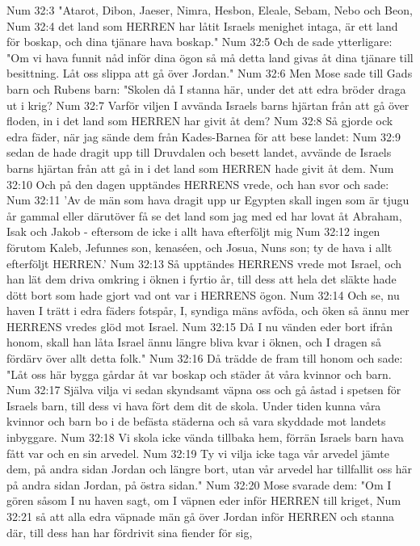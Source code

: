 Num 32:3  "Atarot, Dibon, Jaeser, Nimra, Hesbon, Eleale, Sebam, Nebo och Beon,
Num 32:4  det land som HERREN har låtit Israels menighet intaga, är ett land för boskap, och dina tjänare hava boskap."
Num 32:5  Och de sade ytterligare: "Om vi hava funnit nåd inför dina ögon så må detta land givas åt dina tjänare till besittning. Låt oss slippa att gå över Jordan."
Num 32:6  Men Mose sade till Gads barn och Rubens barn: "Skolen då I stanna här, under det att edra bröder draga ut i krig?
Num 32:7  Varför viljen I avvända Israels barns hjärtan från att gå över floden, in i det land som HERREN har givit åt dem?
Num 32:8  Så gjorde ock edra fäder, när jag sände dem från Kades-Barnea för att bese landet:
Num 32:9  sedan de hade dragit upp till Druvdalen och besett landet, avvände de Israels barns hjärtan från att gå in i det land som HERREN hade givit åt dem.
Num 32:10  Och på den dagen upptändes HERRENS vrede, och han svor och sade:
Num 32:11  'Av de män som hava dragit upp ur Egypten skall ingen som är tjugu år gammal eller därutöver få se det land som jag med ed har lovat åt Abraham, Isak och Jakob - eftersom de icke i allt hava efterföljt mig
Num 32:12  ingen förutom Kaleb, Jefunnes son, kenaséen, och Josua, Nuns son; ty de hava i allt efterföljt HERREN.'
Num 32:13  Så upptändes HERRENS vrede mot Israel, och han lät dem driva omkring i öknen i fyrtio år, till dess att hela det släkte hade dött bort som hade gjort vad ont var i HERRENS ögon.
Num 32:14  Och se, nu haven I trätt i edra fäders fotspår, I, syndiga mäns avföda, och öken så ännu mer HERRENS vredes glöd mot Israel.
Num 32:15  Då I nu vänden eder bort ifrån honom, skall han låta Israel ännu längre bliva kvar i öknen, och I dragen så fördärv över allt detta folk."
Num 32:16  Då trädde de fram till honom och sade: "Låt oss här bygga gårdar åt var boskap och städer åt våra kvinnor och barn.
Num 32:17  Själva vilja vi sedan skyndsamt väpna oss och gå åstad i spetsen för Israels barn, till dess vi hava fört dem dit de skola. Under tiden kunna våra kvinnor och barn bo i de befästa städerna och så vara skyddade mot landets inbyggare.
Num 32:18  Vi skola icke vända tillbaka hem, förrän Israels barn hava fått var och en sin arvedel.
Num 32:19  Ty vi vilja icke taga vår arvedel jämte dem, på andra sidan Jordan och längre bort, utan vår arvedel har tillfallit oss här på andra sidan Jordan, på östra sidan."
Num 32:20  Mose svarade dem: "Om I gören såsom I nu haven sagt, om I väpnen eder inför HERREN till kriget,
Num 32:21  så att alla edra väpnade män gå över Jordan inför HERREN och stanna där, till dess han har fördrivit sina fiender för sig,
